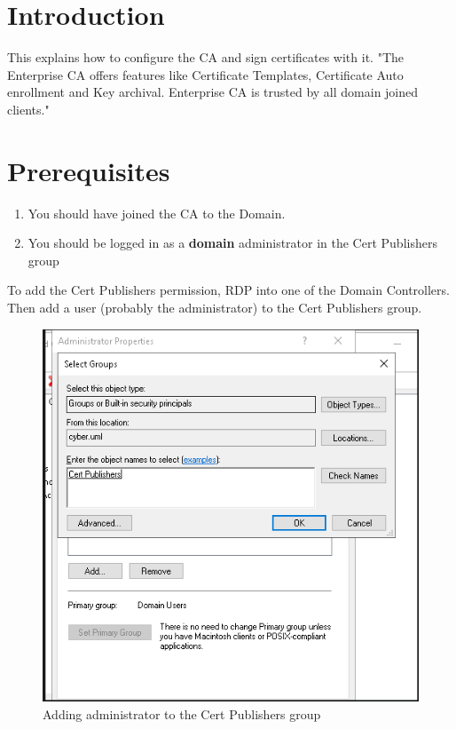\documentclass{article}
\begin{document}
\graphicspath{ {./Images/} }
\tableofcontents

\section{Introduction}
This explains how to configure the CA and sign certificates with it.
"The Enterprise CA offers features like Certificate Templates, Certificate Auto enrollment and Key archival. 
Enterprise CA is trusted by all domain joined clients."

\section{Prerequisites}
\begin {enumerate}
\item You should have joined the CA to the Domain.
\item You should be logged in as a \textbf{domain} administrator in the Cert Publishers group
\end {enumerate}

To add the Cert Publishers permission, RDP into one of the Domain Controllers.
Then add a user (probably the administrator) to the Cert Publishers group.

\begin{figure}[H]
        \centering
        \includegraphics[width=1\textwidth]{AddingCertPublisherPermission.png}
        \caption{Adding administrator to the Cert Publishers group}
        \label{fig:AddingCertPublisherPermission}
\end{figure}
\end{document}
